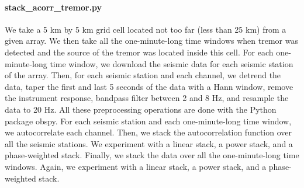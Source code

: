 \documentclass[main.tex]{subfiles}
\begin{document}
\paragraph{stack\_acorr\_tremor.py} We take a 5 km by 5 km grid cell located not too far (less than 25 km) from a given array. We then take all the one-minute-long time windows when tremor was detected and the source of the tremor was located inside this cell. For each one-minute-long time window, we download the seismic data for each seismic station of the array. Then, for each seismic station and each channel, we detrend the data, taper the first and last 5 seconds of the data with a Hann window, remove the instrument response, bandpass filter between 2 and 8 Hz, and resample the data to 20 Hz. All these preprocessing operations are done with the Python package obspy. For each seismic station and each one-minute-long time window, we autocorrelate each channel. Then, we stack the autocorrelation function over all the seismic stations. We experiment with a linear stack, a power stack, and a phase-weighted stack. Finally, we stack the data over all the one-minute-long time windows. Again, we experiment with a linear stack, a power stack, and a phase-weighted stack.

%
%
%
%
%
%
%
\end{document}
